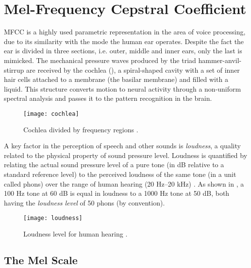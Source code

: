 \newpage


\section{Mel-Frequency Cepstral Coefficient}

MFCC is a highly used parametric representation in the area of voice processing,
due to its similarity with the mode the human ear operates. Despite the fact the
ear is divided in three sections, i.e. outer, middle and inner ears, only the last
is mimicked. The mechanical pressure waves produced by the triad hammer-anvil-stirrup
are received by the cochlea (), a spiral-shaped cavity with a
set of inner hair cells attached to a membrane (the basilar membrane) and filled
with a liquid. This structure converts motion to neural activity through a non-uniform
spectral analysis \cite{rabiner.schafer.2007} and passes it to the pattern
recognition in the brain.

\begin{figure}[ht]
    \centering
    \texttt{[image: cochlea]}
    \caption{Cochlea divided by frequency regions \cite{scienceblogs.2010.05.10}.}
    \label{fig:cochlea}
\end{figure}

A key factor in the perception of speech and other sounds is \emph{loudness}, a
quality related to the physical property of sound pressure level. Loudness is
quantified by relating the actual sound pressure level of a pure tone (in dB
relative to a standard reference level) to the perceived loudness of the same
tone (in a unit called phons) over the range of human hearing (20 Hz–20 kHz)
\cite{rabiner.schafer.2007}. As shown in , a 100 Hz tone
at 60 dB is equal in loudness to a 1000 Hz tone at 50 dB, both having the
\emph{loudness level} of 50 phons (by convention).


\begin{figure}[ht]
    \centering
    \texttt{[image: loudness]}
    \caption{Loudness level for human hearing \cite{fletcher.munson.1933}.}
    \label{fig:loudness}
\end{figure}


\subsection{The Mel Scale}


